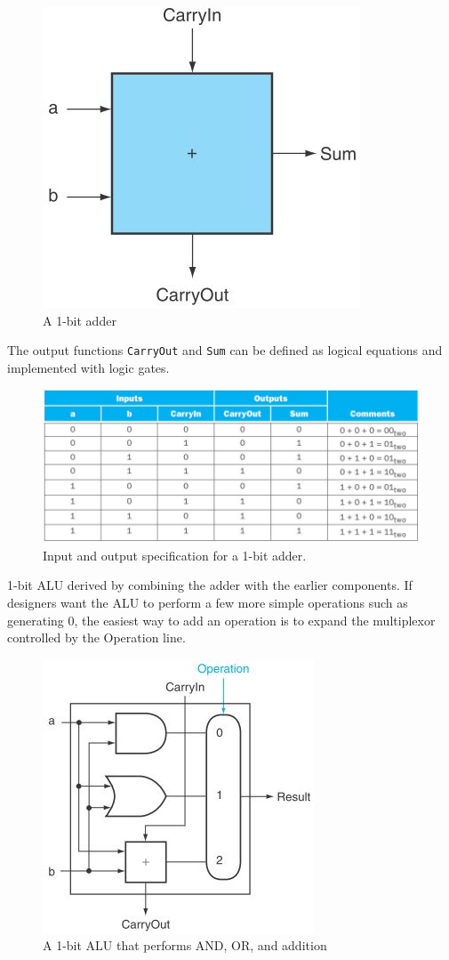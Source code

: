 \documentclass[10pt,a4paper]{article}
\begin{document}
\begin{figure} [h!]
    \centering
    \includegraphics[scale=0.6]{Adder.JPG}
    \caption{A 1-bit adder}
\end{figure}

\pagebreak

The output functions \texttt{CarryOut} and \texttt{Sum} can be defined as logical equations and
implemented with logic gates.
\begin{figure} [h!]
    \centering
    \includegraphics[scale=0.7]{Adder table.JPG}
    \caption{Input and output speciﬁcation for a 1-bit adder.}
\end{figure}

1-bit ALU derived by combining the adder with the earlier components. If designers want the ALU to
perform a few more simple operations such as generating 0, the easiest way to add an operation is to 
expand the multiplexor controlled by the Operation line.
\begin{figure} [h!]
    \centering
    \includegraphics[scale=0.8]{ALU.JPG}
    \caption{A 1-bit ALU that performs AND, OR, and addition}
\end{figure}
\end{document}
